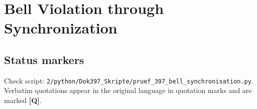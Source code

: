 
\providecommand{\BM}{\textbf{[B]}}
\providecommand{\KM}{\textbf{[K]}}
\providecommand{\SM}{\textbf{[S]}}
\providecommand{\XM}{\textbf{[X]}}
\providecommand{\QM}{\textbf{[Q]}}
\providecommand{\EM}{\textbf{[E]}}

\chapter*{Bell Violation through Synchronization}

\begin{abstract}
Two papers from pilot-wave hydrodynamics show that two classical droplets coupled through a common
wave field can violate the Bell inequality in its CHSH form: in a static test with $S=2.49$, and in a
reduced model with $S\approx3.15$ in the static case and up to $S\approx2.85$ in a test in which the
coupling is switched off before the measurement. The authors trace the violation to deterministic,
wave-mediated synchronization and to the dependence of the wave field on the measurement settings.
This document presents the papers with verbatim quotations, recomputes the bounds and places them in
the deterministic reading of the FFGFT (Docs.~230, 328, 334). The result has two sides. The droplets
show that a deterministic single run with contextual fixing of the outcomes, as Doc.~230 assumes,
can carry Bell violations. They also show that measurement dependence alone knows no Tsirelson
bound: both values of the reduced model lie above $2\sqrt2$, the static one by more than 200
standard errors. In the FFGFT the quantum bound follows from the geometric quotients of Doc.~230, not
from synchronization; dynamic synchronization is ruled out as the mechanism of the FFGFT correlation
because the coupling $K_{\mathrm{eff}}=2\pi\xi$ is about 6000 times weaker than in the droplet model.
\end{abstract}

\section*{Status markers}

Check script: \texttt{2/python/Dok397\_Skripte/pruef\_397\_bell\_synchronisation.py}.
Verbatim quotations appear in the original language in quotation marks and are marked \QM.

